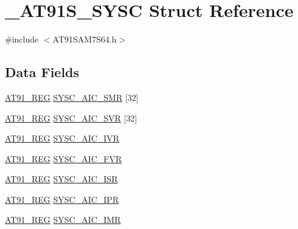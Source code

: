 \hypertarget{struct__AT91S__SYSC}{\section{\-\_\-\-A\-T91\-S\-\_\-\-S\-Y\-S\-C Struct Reference}
\label{struct__AT91S__SYSC}
}


{\ttfamily \#include $<$A\-T91\-S\-A\-M7\-S64.\-h$>$}

\subsection*{Data Fields}
\begin{DoxyCompactItemize}
\item 
\hyperlink{GCC_2ARM7__AT91SAM7S_2AT91SAM7X256_8h_a712ad5a1ac1bd02f3e95a7526c283ce1}{A\-T91\-\_\-\-R\-E\-G} \hyperlink{struct__AT91S__SYSC_a77f8b5e69412b83e2221384ac1b0036b}{S\-Y\-S\-C\-\_\-\-A\-I\-C\-\_\-\-S\-M\-R} \mbox{[}32\mbox{]}
\item 
\hyperlink{GCC_2ARM7__AT91SAM7S_2AT91SAM7X256_8h_a712ad5a1ac1bd02f3e95a7526c283ce1}{A\-T91\-\_\-\-R\-E\-G} \hyperlink{struct__AT91S__SYSC_a8acac53213525a33b71d08d953ed17e3}{S\-Y\-S\-C\-\_\-\-A\-I\-C\-\_\-\-S\-V\-R} \mbox{[}32\mbox{]}
\item 
\hyperlink{GCC_2ARM7__AT91SAM7S_2AT91SAM7X256_8h_a712ad5a1ac1bd02f3e95a7526c283ce1}{A\-T91\-\_\-\-R\-E\-G} \hyperlink{struct__AT91S__SYSC_a6268bf89a23b76facf3cacd7a756dd3f}{S\-Y\-S\-C\-\_\-\-A\-I\-C\-\_\-\-I\-V\-R}
\item 
\hyperlink{GCC_2ARM7__AT91SAM7S_2AT91SAM7X256_8h_a712ad5a1ac1bd02f3e95a7526c283ce1}{A\-T91\-\_\-\-R\-E\-G} \hyperlink{struct__AT91S__SYSC_a265c94a643d649b9e59c2b514bd2fd61}{S\-Y\-S\-C\-\_\-\-A\-I\-C\-\_\-\-F\-V\-R}
\item 
\hyperlink{GCC_2ARM7__AT91SAM7S_2AT91SAM7X256_8h_a712ad5a1ac1bd02f3e95a7526c283ce1}{A\-T91\-\_\-\-R\-E\-G} \hyperlink{struct__AT91S__SYSC_aabbeeb9acff8761c8121aad3b8696b57}{S\-Y\-S\-C\-\_\-\-A\-I\-C\-\_\-\-I\-S\-R}
\item 
\hyperlink{GCC_2ARM7__AT91SAM7S_2AT91SAM7X256_8h_a712ad5a1ac1bd02f3e95a7526c283ce1}{A\-T91\-\_\-\-R\-E\-G} \hyperlink{struct__AT91S__SYSC_a3e549510179e1537fbc0817dca167b6f}{S\-Y\-S\-C\-\_\-\-A\-I\-C\-\_\-\-I\-P\-R}
\item 
\hyperlink{GCC_2ARM7__AT91SAM7S_2AT91SAM7X256_8h_a712ad5a1ac1bd02f3e95a7526c283ce1}{A\-T91\-\_\-\-R\-E\-G} \hyperlink{struct__AT91S__SYSC_a2a0f202036c714f7bf5f9bca1005e665}{S\-Y\-S\-C\-\_\-\-A\-I\-C\-\_\-\-I\-M\-R}

\end{DoxyCompactItemize}
